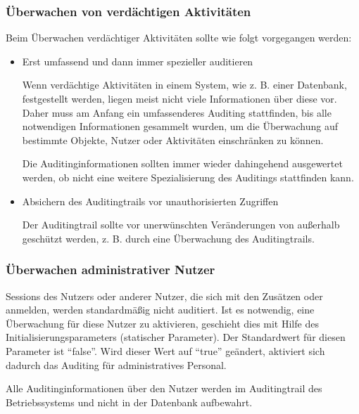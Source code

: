         \subsubsection{\"Uberwachen von verd\"achtigen Aktivit\"aten}
          Beim \"Uberwachen verd\"achtiger Aktivit\"aten sollte wie folgt vorgegangen werden:
          \begin{itemize}
            \item Erst umfassend und dann immer spezieller auditieren

              Wenn verd\"achtige Aktivit\"aten in einem System, wie z. B. einer Datenbank, festgestellt werden, liegen meist nicht viele Informationen \"uber diese vor. Daher muss am Anfang ein umfassenderes Auditing stattfinden, bis alle notwendigen Informationen gesammelt wurden, um die \"Uberwachung auf bestimmte Objekte, Nutzer oder Aktivit\"aten einschr\"anken zu k\"onnen.

              Die Auditinginformationen sollten immer wieder dahingehend ausgewertet werden, ob nicht eine weitere Spezialisierung des Auditings stattfinden kann.
            \item Absichern des Auditingtrails vor unauthorisierten Zugriffen

              Der Auditingtrail sollte vor unerw\"unschten Ver\"anderungen von au\ss erhalb ge\-sch\"u\-tzt werden, z. B. durch eine \"Uberwachung des Auditingtrails.
          \end{itemize}
        \subsubsection{\"Uberwachen administrativer Nutzer}
          Sessions des Nutzers  oder anderer Nutzer, die sich
          mit den Zus\"atzen  oder
           anmelden, werden standardm\"a\ss{}ig
          nicht auditiert. Ist es notwendig, eine \"Uberwachung f\"ur diese
          Nutzer zu aktivieren, geschieht dies mit Hilfe des
          Initialisierungsparameters 
          (statischer Parameter). Der Standardwert f\"ur diesen Parameter ist
          \enquote{false}. Wird dieser Wert auf \enquote{true} ge\"andert,
          aktiviert sich dadurch das Auditing f\"ur administratives Personal.
          \begin{merke}
            Alle Auditinginformationen \"uber den Nutzer  werden im Auditingtrail des Betriebssystems und nicht in der Datenbank aufbewahrt.
          \end{merke}
